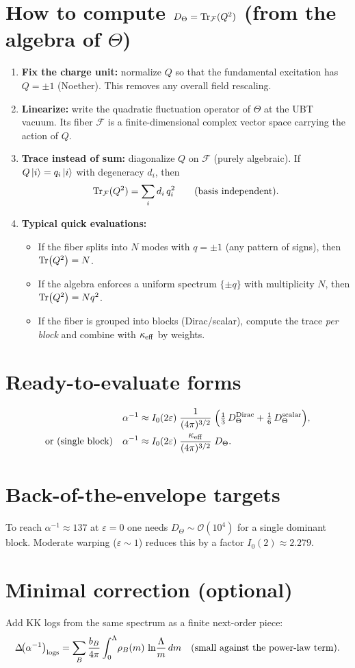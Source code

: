 \documentclass[11pt]{article}
\newcommand{\Izero}{I_0}
\begin{document}
\section*{How to compute $D_\Theta=\Tr_{\mathcal F}(Q^2)$ (from the algebra of $\Theta$)}
\begin{enumerate}
\item \textbf{Fix the charge unit:} normalize $Q$ so that the fundamental excitation has $Q=\pm 1$ (Noether). This removes any overall field rescaling.
\item \textbf{Linearize:} write the quadratic fluctuation operator of $\Theta$ at the UBT vacuum. Its fiber $\mathcal F$ is a finite-dimensional complex vector space carrying the action of $Q$.
\item \textbf{Trace instead of sum:} diagonalize $Q$ on $\mathcal F$ (purely algebraic). If $Q\ket{i}=q_i\ket{i}$ with degeneracy $d_i$, then
\[
\Tr_{\mathcal F}(Q^2)=\sum_i d_i\,q_i^2 \qquad \text{(basis independent)}.
\]
\item \textbf{Typical quick evaluations:}
\begin{itemize}
\item If the fiber splits into $N$ modes with $q=\pm 1$ (any pattern of signs), then $\Tr(Q^2)=N$.
\item If the algebra enforces a uniform spectrum $\{\pm q\}$ with multiplicity $N$, then $\Tr(Q^2)=N q^2$.
\item If the fiber is grouped into blocks (Dirac/scalar), compute the trace \emph{per block} and combine with $\kappa_{\rm eff}$ by weights.
\end{itemize}
\end{enumerate}

\section*{Ready-to-evaluate forms}
\begin{align*}
\alpha^{-1} &\approx \Izero(2\varepsilon)\;\frac{1}{(4\pi)^{3/2}}\;\Big(\tfrac{1}{3}\,D_\Theta^{\rm Dirac}+\tfrac{1}{6}\,D_\Theta^{\rm scalar}\Big),\\
\text{or (single block)}\quad \alpha^{-1} &\approx \Izero(2\varepsilon)\;\frac{\kappa_{\rm eff}}{(4\pi)^{3/2}}\;D_\Theta.
\end{align*}

\section*{Back-of-the-envelope targets}
To reach $\alpha^{-1}\!\approx\!137$ at $\varepsilon=0$ one needs $D_\Theta \sim \mathcal O(10^4)$ for a single dominant block. Moderate warping ($\varepsilon\!\sim\!1$) reduces this by a factor $\Izero(2)\!\approx\!2.279$.

\section*{Minimal correction (optional)}
Add KK logs from the same spectrum as a finite next-order piece:
\[
\Delta\!\big(\alpha^{-1}\big)_{\rm logs} = \sum_B \frac{b_B}{4\pi}\int_0^{\Lambda}\!\rho_B(m)\,\ln\!\frac{\Lambda}{m}\,dm \quad (\text{small against the power-law term}).
\]
\end{document}
